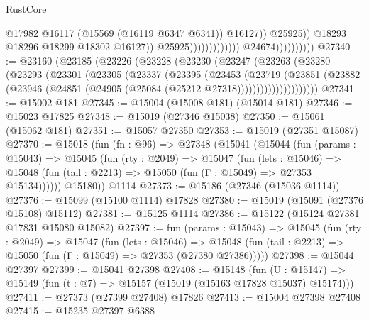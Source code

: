 \begin{lexlean}{RustCore}
\begin{coremodule}
                                                              @17982
                                                              @16117
                                                              (@15569 (@16119 @6347 @6341))
                                                              @16127))
                                                          @25925))
                                                      @18293
                                                      @18296
                                                      @18299
                                                      @18302
                                                      @16127))
                                                  @25925)))))))))))))
                        @24674))))))))))
@27340 := @23160
    (@23185
      (@23226
        (@23228
          (@23230
            (@23247
              (@23263
                (@23280
                  (@23293
                    (@23301
                      (@23305
                        (@23337
                          (@23395
                            (@23453
                              (@23719
                                (@23851
                                  (@23882
                                    (@23946
                                      (@24851 (@24905 (@25084 (@25212 @27318)))))))))))))))))))))
@27341 := @15002 @181
@27345 := @15004 (@15008 @181) (@15014 @181)
@27346 := @15023 @17825
@27348 := @15019 (@27346 @15038)
@27350 := @15061 (@15062 @181)
@27351 := @15057 @27350
@27353 := @15019 (@27351 @15087)
@27370 := @15018
    (fun (fn : @96) =>
    @27348
      (@15041
        (@15044
          (fun (params : @15043) =>
          @15045
            (fun (rty : @2049) =>
            @15047
              (fun (lets : @15046) =>
              @15048 (fun (tail : @2213) => @15050 (fun (Γ : @15049) => @27353 @15134))))))
        @15180))
    @1114
@27373 := @15186 (@27346 (@15036 @1114))
@27376 := @15099 (@15100 @1114) @17828
@27380 := @15019 (@15091 (@27376 @15108) @15112)
@27381 := @15125 @1114
@27386 := @15122 (@15124 @27381 @17831 @15080 @15082)
@27397 := fun (params : @15043) =>
  @15045
    (fun (rty : @2049) =>
    @15047
      (fun (lets : @15046) =>
      @15048 (fun (tail : @2213) => @15050 (fun (Γ : @15049) => @27353 (@27380 @27386)))))
@27398 := @15044 @27397
@27399 := @15041 @27398
@27408 := @15148
    (fun (U : @15147) => @15149 (fun (t : @7) => @15157 (@15019 (@15163 @17828 @15037) @15174)))
@27411 := @27373 (@27399 @27408) @17826
@27413 := @15004 @27398 @27408
@27415 := @15235 @27397 @6388

\end{coremodule}
\end{lexlean}
